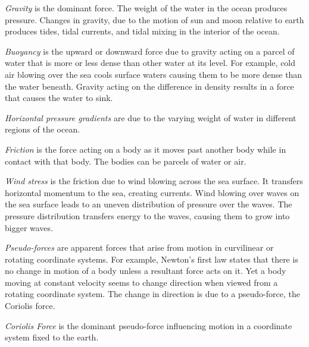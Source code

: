 \begin{enumerate}
\vitem \textit{Gravity} is the dominant force. The weight of the water in the ocean produces pressure. Changes in gravity, due to the motion of sun and moon relative to earth produces tides, tidal currents, and tidal mixing in the interior of the ocean.

\textit{Buoyancy} is the upward or downward force due to gravity
acting on a parcel of water that is more or less dense than other water at its
level. For example, cold air blowing over the sea cools surface waters causing them
to be more dense than the water beneath. Gravity acting on the difference in density results in a
force that causes the water to sink. 

\textit{Horizontal pressure gradients}  are due to the varying weight of water in different regions of the ocean. 

\vitem \textit{Friction} is the force acting on a body as it moves past another body while in contact with that body. The bodies can be parcels of water or air.

\textit{Wind stress} is the friction due to wind blowing across the sea surface. It transfers horizontal momentum to the sea, creating currents. Wind blowing over waves on the sea surface leads to an uneven distribution of pressure over the waves. The pressure distribution transfers energy to the waves, causing them to grow into bigger waves.

\vitem\textit{Pseudo-forces} are apparent forces that arise from motion in
curvilinear or rotating coordinate systems. For example, Newton's first law states that there is no change in motion of a body unless a resultant force acts on it. Yet a body moving at constant velocity
seems to change direction when viewed from a rotating coordinate system. The change
in direction is due to a pseudo-force, the Coriolis force.

\textit{Coriolis Force} is the dominant
pseudo-force influencing motion in a coordinate system fixed to the earth.
\end{enumerate}
\vspace{-1ex}

